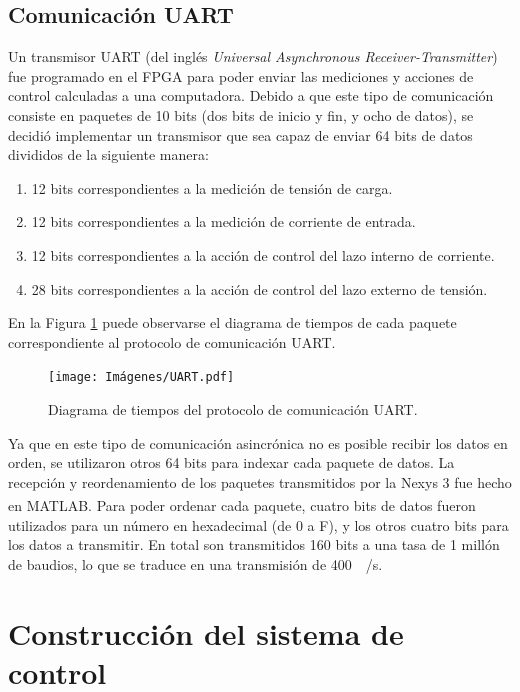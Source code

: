 \subsection{Comunicación UART}

Un transmisor UART (del inglés \emph{Universal Asynchronous Receiver-Transmitter}) fue programado en el FPGA para poder enviar las mediciones y acciones de control calculadas a una computadora. Debido a que este tipo de comunicación consiste en paquetes de 10 bits (dos bits de inicio y fin, y ocho de datos), se decidió implementar un transmisor que sea capaz de enviar 64 bits de datos divididos de la siguiente manera:

\begin{enumerate}
    \item 12 bits correspondientes a la medición de tensión de carga.
    \item 12 bits correspondientes a la medición de corriente de entrada.
    \item 12 bits correspondientes a la acción de control del lazo interno de corriente.
    \item 28 bits correspondientes a la acción de control del lazo externo de tensión.
\end{enumerate}

En la Figura \ref{uart} puede observarse el diagrama de tiempos de cada paquete correspondiente al protocolo de comunicación UART.

\begin{figure}[hbt!]
    \centering
    \texttt{[image: Imágenes/UART.pdf]}
    \caption{Diagrama de tiempos del protocolo de comunicación UART.}
    \label{uart}
\end{figure} 

Ya que en este tipo de comunicación asincrónica no es posible recibir los datos en orden, se utilizaron otros 64 bits para indexar cada paquete de datos. La recepción y reordenamiento de los paquetes transmitidos por la Nexys 3 fue hecho en MATLAB\textsuperscript\textregistered. Para poder ordenar cada paquete, cuatro bits de datos fueron utilizados para un número en hexadecimal (de 0 a F), y los otros cuatro bits para los datos a transmitir. En total son transmitidos 160 bits a una tasa de 1 millón de baudios, lo que se traduce en una transmisión de \SI{400}{\kilo\sample/\second}.

\section{Construcción del sistema de control}

